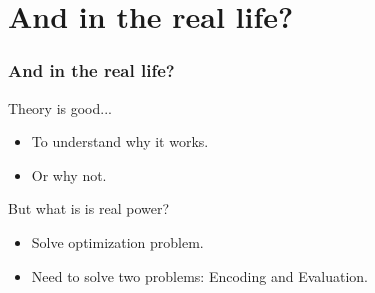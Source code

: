 \section{And in the real life?}
\begin{frame}
  \frametitle{And in the real life?}

  \begin{block}{Theory is good...}
    \begin{itemize}
    \item<1-2> To understand why it works.
    \item<2> Or why not.
    \end{itemize}
  \end{block}

   {

    \begin{block}{But what is is real power?}
      \begin{itemize}
      \item<3-4> Solve optimization problem.
      \item<4> Need to solve two problems: Encoding and Evaluation.
      \end{itemize}
    \end{block}
  }
\end{frame}





